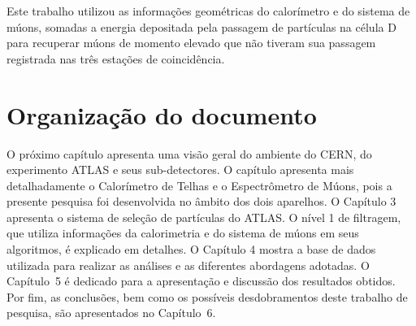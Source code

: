 Este trabalho utilizou as informações geométricas do calorímetro e do sistema de
múons, somadas a energia depositada pela passagem de partículas na célula D para
recuperar múons de momento elevado que não tiveram sua passagem registrada nas
três estações de coincidência.

\section{Organização do documento}

O próximo capítulo apresenta uma visão geral do ambiente do CERN, do experimento
ATLAS e seus sub-detectores.  O capítulo apresenta mais detalhadamente o
Calorímetro de Telhas e o Espectrômetro de Múons, pois a presente pesquisa foi
desenvolvida no âmbito dos dois aparelhos.  O Capítulo 3 apresenta o sistema de
seleção de partículas do ATLAS. O nível 1 de filtragem, que utiliza informações
da calorimetria e do sistema de múons em seus algoritmos, é explicado em
detalhes. O Capítulo 4 mostra a base de dados utilizada para realizar as
análises e as diferentes abordagens adotadas. O Capítulo~5  é dedicado para a
apresentação e discussão dos resultados obtidos.   Por fim, as conclusões, bem
como os possíveis desdobramentos deste trabalho de pesquisa, são apresentados no
Capítulo~6.
